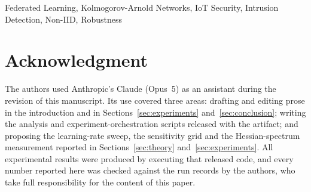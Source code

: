 \documentclass[journal]{IEEEtran}
\begin{document}
\begin{IEEEkeywords}
Federated Learning, Kolmogorov-Arnold Networks, IoT Security, Intrusion Detection, Non-IID, Robustness
\end{IEEEkeywords}








\section*{Acknowledgment}
The authors used Anthropic's Claude (Opus~5) as an assistant during the revision of this
manuscript. Its use covered three areas: drafting and editing prose in the introduction and in
Sections~\ref{sec:experiments} and~\ref{sec:conclusion}; writing the analysis and
experiment-orchestration scripts released with the artifact; and proposing the learning-rate
sweep, the sensitivity grid and the Hessian-spectrum measurement reported in
Sections~\ref{sec:theory} and~\ref{sec:experiments}. All experimental results were produced by
executing that released code, and every number reported here was checked against the run
records by the authors, who take full responsibility for the content of this paper.



\end{document}
